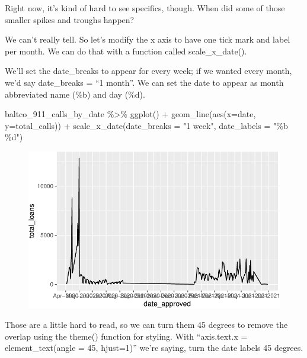 \documentclass[
  letterpaper,
  DIV=11,
  numbers=noendperiod]{scrreprt}
\newenvironment{Shaded}{\begin{snugshade}}{\end{snugshade}}
\newcommand{\AttributeTok}[1]{\textcolor[rgb]{0.40,0.45,0.13}{#1}}
\newcommand{\FunctionTok}[1]{\textcolor[rgb]{0.28,0.35,0.67}{#1}}
\newcommand{\NormalTok}[1]{\textcolor[rgb]{0.00,0.23,0.31}{#1}}
\newcommand{\SpecialCharTok}[1]{\textcolor[rgb]{0.37,0.37,0.37}{#1}}
\newcommand{\StringTok}[1]{\textcolor[rgb]{0.13,0.47,0.30}{#1}}
\begin{document}
Right now, it's kind of hard to see specifics, though. When did some of
those smaller spikes and troughs happen?

We can't really tell. So let's modify the x axis to have one tick mark
and label per month. We can do that with a function called
scale\_x\_date().

We'll set the date\_breaks to appear for every week; if we wanted every
month, we'd say date\_breaks = ``1 month''. We can set the date to
appear as month abbreviated name (\%b) and day (\%d).

\begin{Shaded}
\begin{Highlighting}[]
\NormalTok{baltco\_911\_calls\_by\_date }\SpecialCharTok{\%\textgreater{}\%}
  \FunctionTok{ggplot}\NormalTok{() }\SpecialCharTok{+} 
  \FunctionTok{geom\_line}\NormalTok{(}\FunctionTok{aes}\NormalTok{(}\AttributeTok{x=}\NormalTok{date, }\AttributeTok{y=}\NormalTok{total\_calls)) }\SpecialCharTok{+} 
  \FunctionTok{scale\_x\_date}\NormalTok{(}\AttributeTok{date\_breaks =} \StringTok{"1 week"}\NormalTok{, }\AttributeTok{date\_labels =} \StringTok{"\%b \%d"}\NormalTok{)}
\end{Highlighting}
\end{Shaded}

\begin{figure}[H]

{\centering \includegraphics{./visualizing-for-reporting_files/figure-pdf/unnamed-chunk-14-1.pdf}

}

\end{figure}

Those are a little hard to read, so we can turn them 45 degrees to
remove the overlap using the theme() function for styling. With
``axis.text.x = element\_text(angle = 45, hjust=1)'' we're saying, turn
the date labels 45 degrees.
\end{document}
